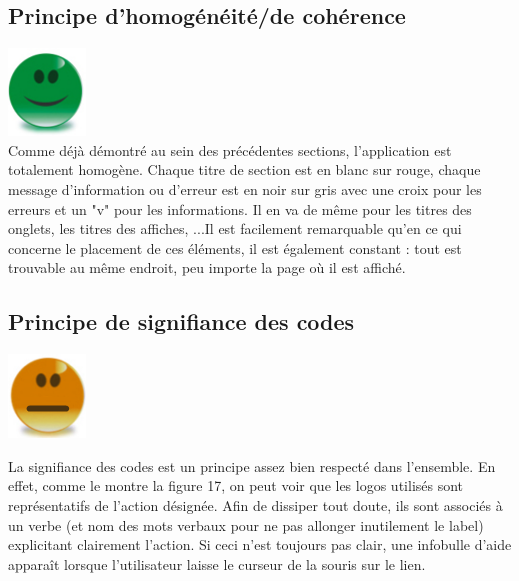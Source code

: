 \documentclass{article}
\begin{document}
\begin{sffamily}
\subsection{Principe d'homogénéité/de cohérence}

\includegraphics[scale=0.27]{good.png} \\

Comme déjà démontré au sein des précédentes sections, l'application est totalement homogène. Chaque titre de section est en blanc sur rouge, chaque 
message d'information ou d'erreur est en noir sur gris avec une croix pour les erreurs et un "v" pour les informations. Il en va de même pour les 
titres des onglets, les titres des affiches, ...Il est facilement remarquable qu'en ce qui concerne le placement de ces éléments, il est également 
constant : tout est trouvable au même endroit, peu importe la page où il est affiché.

\subsection{Principe de signifiance des codes}

\includegraphics[scale=0.365]{mid.png}

La signifiance des codes est un principe assez bien respecté dans l'ensemble. En effet, comme le montre la figure 17, on peut voir que les logos utilisés sont représentatifs 
de l'action désignée. Afin de dissiper tout doute, ils sont associés à un verbe (et nom des mots verbaux pour ne pas allonger inutilement le label) explicitant clairement 
l'action. Si ceci n'est toujours pas clair, une infobulle d'aide apparaît lorsque l'utilisateur laisse le curseur de la souris sur le lien.


\end{sffamily}
\end{document}

